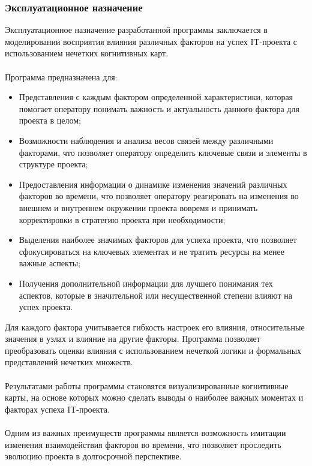\documentclass{article}
\begin{document}
    \subsubsection {Эксплуатационное назначение}
    Эксплуатационное назначение разработанной программы заключается в моделировании восприятия влияния различных факторов на успех IT-проекта с использованием нечетких когнитивных карт.\\
    ~\\
    Программа предназначена для:
    \begin{itemize}
        \item Представления с каждым фактором определенной характеристики, которая помогает оператору понимать важность и актуальность данного фактора для проекта в целом;
        \item Возможности наблюдения и анализа весов связей между различными факторами, что позволяет оператору определить ключевые связи и элементы в структуре проекта;
        \item Предоставления информации о динамике изменения значений различных факторов во времени, что позволяет оператору реагировать на изменения во внешнем и внутреннем окружении проекта вовремя и принимать корректировки в стратегию проекта при необходимости;
        \item Выделения наиболее значимых факторов для успеха проекта, что позволяет сфокусироваться на ключевых элементах и не тратить ресурсы на менее важные аспекты;
        \item Получения дополнительной информации для лучшего понимания тех аспектов, которые в значительной или несущественной степени влияют на успех проекта.
    \end{itemize}
    Для каждого фактора учитывается гибкость настроек его влияния, относительные значения в узлах и влияние на другие факторы. Программа позволяет преобразовать оценки влияния с использованием нечеткой логики и формальных представлений нечетких множеств.\\
    ~\\
    Результатами работы программы становятся визуализированные когнитивные карты, на основе которых можно сделать выводы о наиболее важных моментах и факторах успеха IT-проекта.\\
    ~\\
    Одним из важных преимуществ программы является возможность имитации изменения взаимодействия факторов во времени, что позволяет проследить эволюцию проекта в долгосрочной перспективе.
\end{document}
